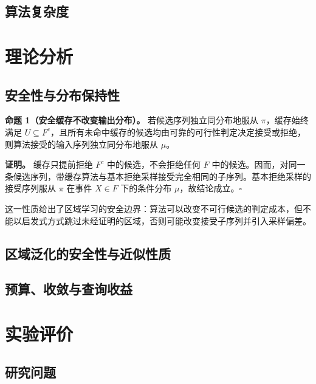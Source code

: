 \documentclass[UTF8, fontset=none, a4paper, 12pt]{ctexart}
\begin{document}
\subsection{算法复杂度}


\section{理论分析}

\subsection{安全性与分布保持性}

\textbf{命题 1（安全缓存不改变输出分布）。}
若候选序列独立同分布地服从 $\pi$，缓存始终满足 $U\subseteq F^c$，且所有未命中缓存的候选均由可靠的可行性判定决定接受或拒绝，则算法接受的输入序列独立同分布地服从 $\mu$。

\textbf{证明。}
缓存只提前拒绝 $F^c$ 中的候选，不会拒绝任何 $F$ 中的候选。因而，对同一条候选序列，带缓存算法与基本拒绝采样接受完全相同的子序列。基本拒绝采样的接受序列服从 $\pi$ 在事件 $X\in F$ 下的条件分布 $\mu$，故结论成立。\hfill$\square$

这一性质给出了区域学习的安全边界：算法可以改变不可行候选的判定成本，但不能以启发式方式跳过未经证明的区域，否则可能改变接受子序列并引入采样偏差。

\subsection{区域泛化的安全性与近似性质}


\subsection{预算、收敛与查询收益}


\section{实验评价}

\subsection{研究问题}
\end{document}
